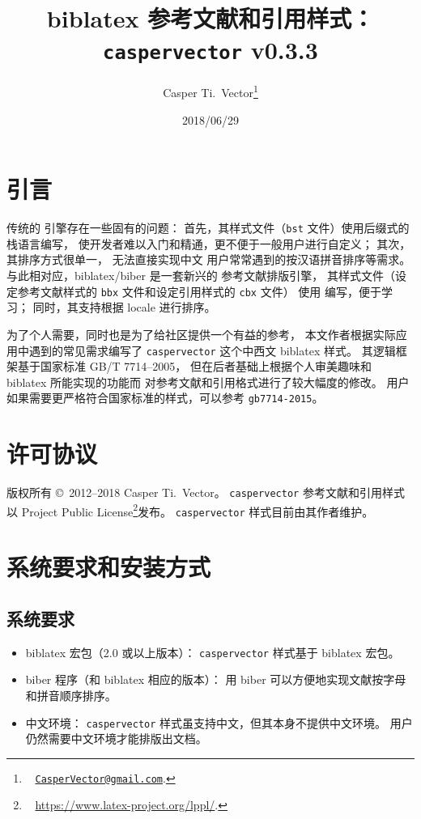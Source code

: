 \documentclass[UTF8]{ctexart}
\begin{document}
\title{\textbf{biblatex 参考文献和引用样式：\texttt{caspervector} v0.3.3}}
\author{%
	Casper Ti.\ Vector\thanks{\ %
		\href{mailto:CasperVector@gmail.com}{\texttt{CasperVector@gmail.com}}.%
	}%
}
\date{2018/06/29}
\maketitle

\section{引言}

传统的  引擎存在一些固有的问题：
首先，其样式文件（\verb|bst| 文件）使用后缀式的栈语言编写，
使开发者难以入门和精通，更不便于一般用户进行自定义；
其次，其排序方式很单一，
无法直接实现中文  用户常常遇到的按汉语拼音排序等需求。
与此相对应，biblatex\supercite{biblatex}/biber\supercite{biber}
是一套新兴的  参考文献排版引擎，
其样式文件（设定参考文献样式的 \verb|bbx| 文件和设定引用样式的 \verb|cbx| 文件）
使用  编写，便于学习；
同时，其支持根据 locale 进行排序。

为了个人需要，同时也是为了给社区提供一个有益的参考，
本文作者根据实际应用中遇到的常见需求编写了
\verb|caspervector| 这个中西文 biblatex 样式。
其逻辑框架基于国家标准 GB/T 7714--2005\supercite{gbt7714-2005}，
但在后者基础上根据个人审美趣味和 biblatex 所能实现的功能而
对参考文献和引用格式进行了较大幅度的修改。
用户如果需要更严格符合国家标准的样式，可以参考
\verb|gb7714-2015|\supercite{blx-gb7714-2015}。

\section{许可协议}

版权所有 \copyright\ 2012--2018 Casper Ti.\ Vector。%
\verb|caspervector| 参考文献和引用样式以
 Project Public License\footnote{\ %
	\url{https://www.latex-project.org/lppl/}.%
}发布。%
\verb|caspervector| 样式目前由其作者维护。

\section{系统要求和安装方式}
\subsection{系统要求}

\begin{itemize}
	\item biblatex 宏包（2.0 或以上版本）：%
		\verb|caspervector| 样式基于 biblatex 宏包。
	\item biber 程序（和 biblatex 相应的版本）：
		用 biber 可以方便地实现文献按字母和拼音顺序排序。
	\item 中文环境：%
		\verb|caspervector| 样式虽支持中文，但其本身不提供中文环境。
		用户仍然需要中文环境才能排版出文档。
\end{itemize}
\end{document}
